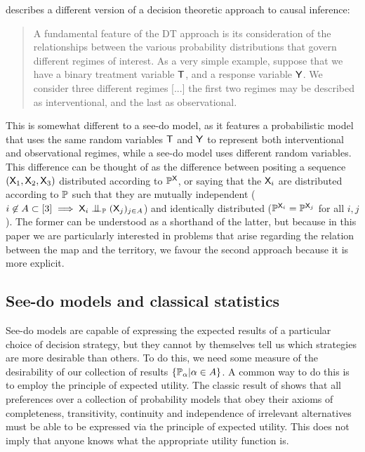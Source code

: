 \citet{dawid_decision-theoretic_2020} describes a different version of a decision theoretic approach to causal inference:

\begin{quote}
A fundamental feature of the DT approach is its consideration of the relationships between the various probability distributions that govern different regimes of interest. As a very simple example, suppose that we have a binary treatment variable $\mathsf{T}$, and a response variable $\mathsf{Y}$. We consider three different regimes [...] the first two regimes may be described as interventional, and the last as observational.
\end{quote}

This is somewhat different to a see-do model, as it features a probabilistic model that uses the same random variables $\mathsf{T}$ and $\mathsf{Y}$ to represent both interventional and observational regimes, while a see-do model uses different random variables. This difference can be thought of as the difference between positing a sequence $(\mathsf{X}_1,\mathsf{X}_2,\mathsf{X}_3)$ distributed according to $\mathbb{P}^{\mathsf{X}}$, or saying that the $\mathsf{X}_i$ are distributed according to $\mathbb{P}$ such that they are mutually independent ($i\not\in A\subset[3]\implies \RV{X}_i\CI_{\prob{P}} (\RV{X}_j)_{j\in A}$) and identically distributed ($\mathbb{P}^{\mathsf{X}_i}=\mathbb{P}^{\mathsf{X}_j}$ for all $i,j$). The former can be understood as a shorthand of the latter, but because in this paper we are particularly interested in problems that arise regarding the relation between the map and the territory, we favour the second approach because it is more explicit.

\subsection{See-do models and classical statistics}

See-do models are capable of expressing the expected results of a particular choice of decision strategy, but they cannot by themselves tell us which strategies are more desirable than others. To do this, we need some measure of the desirability of our collection of results $\{\mathbb{P}_\alpha|\alpha\in A\}$. A common way to do this is to employ the principle of expected utility. The classic result of \citet{von_neumann_theory_1944} shows that all preferences over a collection of probability models that obey their axioms of completeness, transitivity, continuity and independence of irrelevant alternatives must be able to be expressed via the principle of expected utility. This does not imply that anyone knows what the appropriate utility function is.


